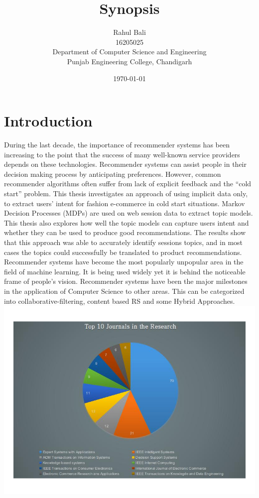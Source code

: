 \documentclass[12pt,a4paper]{article}
\title{\textbf{Synopsis}}
\author{Rahul Bali\\16205025\\Department of Computer Science and Engineering\\Punjab Engineering College, Chandigarh}
\date{\today}
\begin{document}
	\maketitle

	\section{Introduction}
	During the last decade, the importance of recommender systems has been increasing to the point that the success of many well-known service providers depends on these technologies. Recommender systems can assist people in their decision making process by anticipating preferences. However, common recommender algorithms often suffer from lack of explicit feedback and the “cold start” problem. This thesis investigates an approach of using implicit data only, to extract users’ intent for fashion e-commerce in cold start situations. Markov Decision Processes (MDPs) are used on web session data to extract topic models. This thesis also explores how well the topic models can capture users intent and whether they can be used to produce good recommendations. The results show that this approach was able to accurately identify sessions topics, and in most cases the topics could successfully be translated to product recommendations.\\

	Recommender systems have become the most popularly unpopular area in the field of machine learning. It is being used widely yet it is behind the noticeable frame of people's vision. Recommender systems have been the major milestones in the application of Computer Science to other areas. This can be categorized into collaborative-filtering, content based RS and some Hybrid Approaches.\\
	
	\includegraphics[width=\linewidth]{images/Untitled1.png}\\
\end{document}

